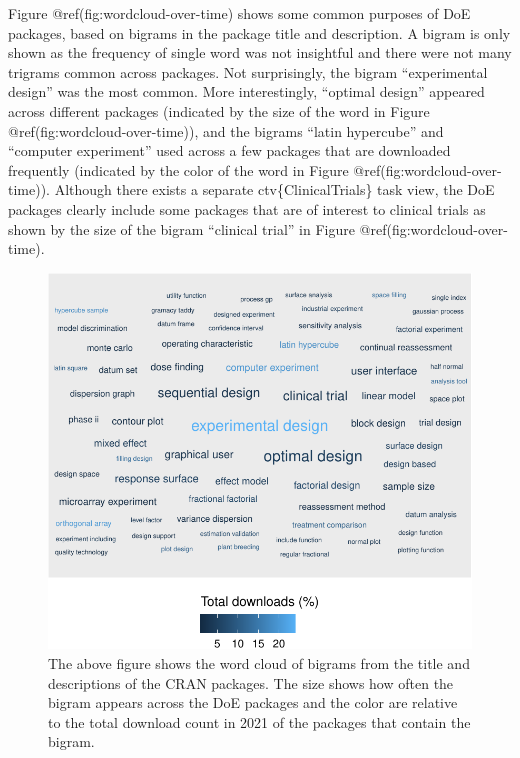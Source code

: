 \documentclass{article}
\begin{document}
Figure @ref(fig:wordcloud-over-time) shows some common purposes of DoE
packages, based on bigrams in the package title and description. A
bigram is only shown as the frequency of single word was not insightful
and there were not many trigrams common across packages. Not
surprisingly, the bigram ``experimental design'' was the most common.
More interestingly, ``optimal design'' appeared across different
packages (indicated by the size of the word in Figure
@ref(fig:wordcloud-over-time)), and the bigrams ``latin hypercube'' and
``computer experiment'' used across a few packages that are downloaded
frequently (indicated by the color of the word in Figure
@ref(fig:wordcloud-over-time)). Although there exists a separate
ctv\{ClinicalTrials\} task view, the DoE packages clearly include some
packages that are of interest to clinical trials as shown by the size of
the bigram ``clinical trial'' in Figure @ref(fig:wordcloud-over-time).

\begin{figure}[htbp]

{\centering \includegraphics{figures/wordcloud-over-time-1} 

}

\caption{The above figure shows the word cloud of bigrams from the title and descriptions of the CRAN packages. The size shows how often the bigram appears across the DoE packages and the color are relative to the total download count in 2021 of the packages that contain the bigram.}\label{fig:wordcloud-over-time}
\end{figure}
\end{document}

